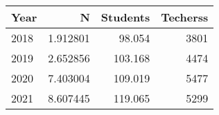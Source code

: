 
\begin{table}[ht]
\centering
\begin{tabular}{lrrr}
  \hline
 Year & N & Students & Techerss \\ 
  \hline
2018 & 1.912801 & 98.054 & 3801 \\ 
  2019 & 2.652856 & 103.168 & 4474 \\ 
  2020 & 7.403004 & 109.019 & 5477 \\ 
  2021 & 8.607445 & 119.065 & 5299 \\ 

   \hline
\end{tabular}
\end{table}


